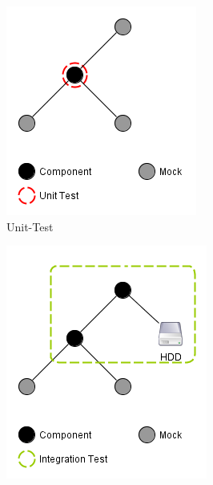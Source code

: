\begin{figure}[h]
\centering
	\begin{subfigure}[b]{0.29\textwidth}
	\centering
	\captionsetup{justification=centering}
	\includegraphics[width=\textwidth]{./images/Kapitel_Einleitung/Unit_Test.png}
	\caption{Unit-Test}
	\label{fig:Unit_Test}
	\end{subfigure}
	\begin{subfigure}[b]{0.29\textwidth}
	\centering
	\captionsetup{justification=centering}
	\includegraphics[width=\textwidth]{./images/Kapitel_Einleitung/Integrations_Test.png}

\end{subfigure}
\end{figure}
